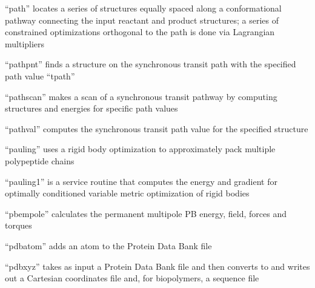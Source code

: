 \documentclass[letterpaper,11pt,english]{sphinxmanual}
\begin{document}



“path” locates a series of structures equally spaced along
a conformational pathway connecting the input reactant and
product structures; a series of constrained optimizations
orthogonal to the path is done via Lagrangian multipliers



“pathpnt” finds a structure on the synchronous transit path
with the specified path value “tpath”


“pathscan” makes a scan of a synchronous transit pathway by
computing structures and energies for specific path values


“pathval” computes the synchronous transit path value for
the specified structure


“pauling” uses a rigid body optimization to approximately
pack multiple polypeptide chains


“pauling1” is a service routine that computes the energy
and gradient for optimally conditioned variable metric
optimization of rigid bodies



“pbempole” calculates the permanent multipole PB energy,
field, forces and torques



“pdbatom” adds an atom to the Protein Data Bank file


“pdbxyz” takes as input a Protein Data Bank file and then
converts to and writes out a Cartesian coordinates file and,
for biopolymers, a sequence file

\end{document}
